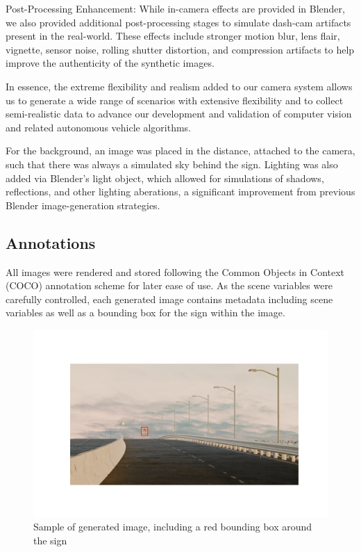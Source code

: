 \documentclass[journal]{IEEEtran}
\begin{document}
Post-Processing Enhancement: While in-camera effects are provided in Blender, we also provided additional post-processing stages to simulate dash-cam artifacts present in the real-world. These effects include stronger motion blur, lens flair, vignette, sensor noise, rolling shutter distortion, and compression artifacts to help improve the authenticity of the synthetic images. 

In essence, the extreme flexibility and realism added to our camera system allows us to generate a wide range of scenarios with extensive flexibility and to collect semi-realistic data to advance our development and validation of computer vision and related autonomous vehicle algorithms.

For the background, an image was placed in the distance, attached to the camera, such that there was always a simulated sky behind the sign. Lighting was also added via Blender's light object, which allowed for simulations of shadows, reflections, and other lighting aberations, a significant improvement from previous Blender image-generation strategies\cite{blender_paper}. 

\subsection{Annotations}
All images were rendered and stored following the Common Objects in Context (COCO) annotation scheme for later ease of use. As the scene variables were carefully controlled, each generated image contains metadata including scene variables as well as a bounding box for the sign within the image. 

\begin{figure}[ht]
    \centering
    \includegraphics[width=\linewidth]{images/sign w box.png}
    \caption{Sample of generated image, including a red bounding box around the sign}
    \label{fig:row_of_images}
\end{figure}
\end{document}
